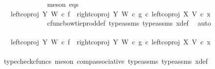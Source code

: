 \begin{isabellebody}
\ \ \ \ \ \ \ \ \ \ \ \ \isamarkupfalse%
\ {\isacharparenleft}{\kern0pt}meson\ eqs{\isacharparenright}{\kern0pt}\isanewline
\ \ \ \ \ \ \ \ \ \ \isamarkupfalse%
\ \isamarkupfalse%
\ {\isachardoublequoteopen}{\isachardot}{\kern0pt}{\isachardot}{\kern0pt}{\isachardot}{\kern0pt}\ {\isacharequal}{\kern0pt}\ {\isacharparenleft}{\kern0pt}{\isacharparenleft}{\kern0pt}left{\isacharunderscore}{\kern0pt}coproj\ Y\ W\ {\isasymcirc}\isactrlsub c\ f{\isacharparenright}{\kern0pt}\ {\isasymamalg}\ {\isacharparenleft}{\kern0pt}right{\isacharunderscore}{\kern0pt}coproj\ Y\ W\ {\isasymcirc}\isactrlsub c\ g{\isacharparenright}{\kern0pt}{\isacharparenright}{\kern0pt}\ {\isasymcirc}\isactrlsub c\ left{\isacharunderscore}{\kern0pt}coproj\ X\ V\ {\isasymcirc}\isactrlsub c\ x{}{\isachardoublequoteclose}\isanewline
\ \ \ \ \ \ \ \ \ \ \ \ \isamarkupfalse%
\ cfunc{\isacharunderscore}{\kern0pt}bowtie{\isacharunderscore}{\kern0pt}prod{\isacharunderscore}{\kern0pt}def{}\ type{\isacharunderscore}{\kern0pt}assms{\isacharparenleft}{\kern0pt}{}{\isacharparenright}{\kern0pt}\ type{\isacharunderscore}{\kern0pt}assms{\isacharparenleft}{\kern0pt}{}{\isacharparenright}{\kern0pt}\ x{}{\isacharunderscore}{\kern0pt}def\ \isamarkupfalse%
\ auto\isanewline
\ \ \ \ \ \ \ \ \ \ \isamarkupfalse%
\ \isamarkupfalse%
\ {\isachardoublequoteopen}{\isachardot}{\kern0pt}{\isachardot}{\kern0pt}{\isachardot}{\kern0pt}\ {\isacharequal}{\kern0pt}\ {\isacharparenleft}{\kern0pt}{\isacharparenleft}{\kern0pt}{\isacharparenleft}{\kern0pt}{\isacharparenleft}{\kern0pt}left{\isacharunderscore}{\kern0pt}coproj\ Y\ W{\isacharparenright}{\kern0pt}\ {\isasymcirc}\isactrlsub c\ f{\isacharparenright}{\kern0pt}\ {\isasymamalg}\ {\isacharparenleft}{\kern0pt}right{\isacharunderscore}{\kern0pt}coproj\ Y\ W\ {\isasymcirc}\isactrlsub c\ g{\isacharparenright}{\kern0pt}{\isacharparenright}{\kern0pt}\ {\isasymcirc}\isactrlsub c\ left{\isacharunderscore}{\kern0pt}coproj\ X\ V{\isacharparenright}{\kern0pt}\ {\isasymcirc}\isactrlsub c\ x{}{\isachardoublequoteclose}\isanewline
\ \ \ \ \ \ \ \ \ \ \ \ \isamarkupfalse%
\ {\isacharparenleft}{\kern0pt}typecheck{\isacharunderscore}{\kern0pt}cfuncs{\isacharcomma}{\kern0pt}\ meson\ comp{\isacharunderscore}{\kern0pt}associative{}\ type{\isacharunderscore}{\kern0pt}assms{\isacharparenleft}{\kern0pt}{}{\isacharparenright}{\kern0pt}\ type{\isacharunderscore}{\kern0pt}assms{\isacharparenleft}{\kern0pt}{}{\isacharparenright}{\kern0pt}\ x{}{\isacharunderscore}{\kern0pt}def{\isacharparenright}{\kern0pt}\isanewline

\end{isabellebody}
